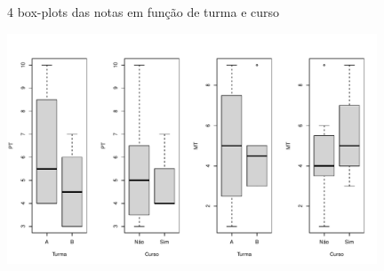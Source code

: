 \documentclass[
  ignorenonframetext,
  serif,
  professionalfont,
  usenames,
  dvipsnames,
  aspectratio = 169]{beamer}
\begin{document}
\begin{frame}{4 box-plots das notas em função de turma e curso}
\label{box-plots-das-notas-em-funuxe7uxe3o-de-turma-e-curso}
\begin{center}\includegraphics[width=11cm]{exercicios-encontro2-solucao_files/figure-beamer/unnamed-chunk-30-1} \end{center}
\end{frame}
\end{document}
